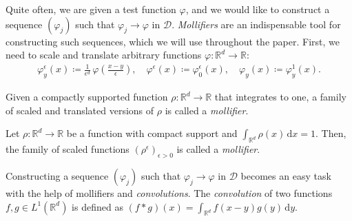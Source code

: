 Quite often, we are given a test function $\varphi$, and we would like to construct a sequence $(\varphi_j)$ such that $\varphi_j \to \varphi  \text{ in $\mathcal{D}$}$. \emph{Mollifiers} are an indispensable tool for constructing such sequences, which we will use throughout the paper. First, we need to scale and translate arbitrary functions $\varphi: \mathbb{R}^d \to \mathbb{R}$:
\begin{align*}
    \varphi^\epsilon_y(x) \coloneqq \frac{1}{\epsilon^d} \, \varphi\left(\frac{x-y}{\epsilon}\right), \quad \varphi^\epsilon(x) \coloneqq \varphi^\epsilon_0(x), \quad \varphi_y(x) \coloneqq \varphi^1_y(x).
\end{align*} 

Given a compactly supported function $\rho: \mathbb{R}^d \to \mathbb{R}$ that integrates to one, a family of scaled and translated versions of $\rho$ is called a \emph{mollifier}.

\begin{definition}[Mollifier]
    Let $\rho: \mathbb{R}^d \to \mathbb{R}$ be a function with compact support and $\int_{\mathbb{R}^d} \rho(x) \, \mathrm{d}x = 1$. Then, the family of scaled functions $(\rho^\epsilon)_{\epsilon > 0}$ is called a \emph{mollifier}.
\end{definition}

Constructing a sequence $(\varphi_j)$ such that $\varphi_j \to \varphi$ in $\mathcal{D}$ becomes an easy task with the help of mollifiers and \emph{convolutions}. The \emph{convolution} of two functions $f,g \in {L}^1(\mathbb{R}^d)$ is defined as $(f*g)(x) = \int_{\mathbb{R}^d} f(x - y)g(y) \, \mathrm{d}y$. 

